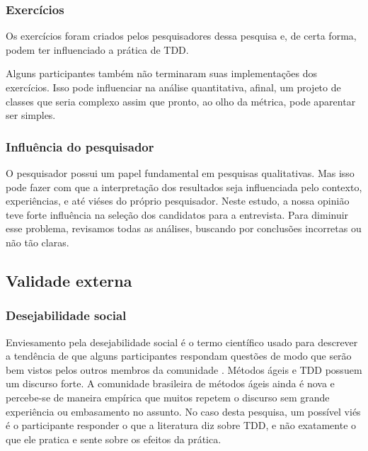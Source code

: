 \documentclass[conference]{IEEEtran}
\begin{document}
\subsubsection{Exercícios}

Os exercícios foram criados pelos pesquisadores dessa pesquisa e, de certa forma,
podem ter influenciado a prática de TDD.

Alguns participantes também não terminaram suas implementações dos exercícios. Isso
pode influenciar na análise quantitativa, afinal, um projeto de classes que
seria complexo assim que pronto, ao olho da métrica, pode aparentar ser simples.

\subsubsection{Influência do pesquisador}

O pesquisador possui
um papel fundamental em pesquisas qualitativas. Mas isso pode fazer com que
a interpretação dos resultados seja influenciada pelo contexto, experiências,
e até viéses do próprio pesquisador.
Neste estudo, a nossa opinião teve forte influência na seleção dos candidatos
para a entrevista.
Para diminuir esse problema, revisamos todas as análises,
buscando por conclusões incorretas ou não tão claras. 

\subsection{Validade externa}

\subsubsection{Desejabilidade social}

Enviesamento pela desejabilidade social é o termo científico usado para descrever
a tendência de que alguns participantes respondam questões de modo que serão
bem vistos pelos outros membros da comunidade \cite{crowne}.
Métodos ágeis e TDD possuem um discurso forte. A comunidade brasileira de métodos
ágeis ainda é nova e percebe-se de maneira empírica que muitos repetem o discurso
sem grande experiência ou embasamento no assunto.
No caso desta pesquisa, um possível viés é o participante responder o que
a literatura diz sobre TDD, e não exatamente o que ele pratica e sente sobre
os efeitos da prática. 
\end{document}
